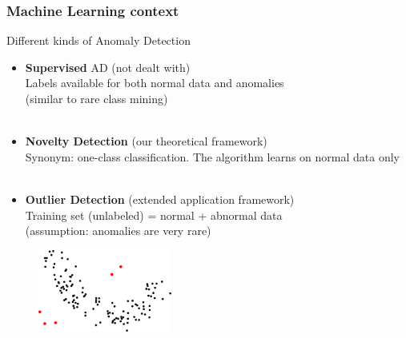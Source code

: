 \documentclass[9pt]{beamer}
\newcommand\red{\color{red} }
\begin{document}
\begin{frame}
\frametitle{Machine Learning context}
\begin{block}{Different kinds of Anomaly Detection}
\begin{itemize}
\item \textbf{Supervised} AD {\red (not dealt with)}\\
Labels available for both normal data and anomalies\\
(similar to rare class mining)\\~\\

\item \textbf{Novelty Detection} {\red (our theoretical framework)}\\
Synonym: one-class classification.
The algorithm learns on normal data only\\~\\

\item \textbf{Outlier Detection} {\red (extended application framework)}\\
Training set (unlabeled) = normal + abnormal data \\
(assumption: anomalies are very rare)
\end{itemize}
\end{block}
\begin{figure}
\includegraphics[height=2.7cm]{sourcefigs/AD_intro.pdf}
\end{figure}
\end{frame}
\end{document}
